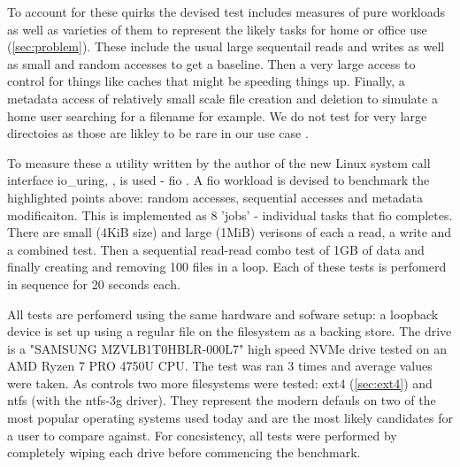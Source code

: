        To account for these quirks the devised test includes measures of pure
        workloads as well as varieties of them to represent the likely tasks
        for home or office use (\autoref{sec:problem}). These include the usual
        large sequentail reads and writes as well as small and random accesses
        to get a baseline. Then a very large access to control for things like
        caches that might be speeding things up. Finally, a metadata access of
        relatively small scale file creation and deletion to simulate a home
        user searching for a filename for example. We do not test for very
        large directoies as those are likley to be rare in our use case
        \cite{contents_study}.


        To measure these a utility written by the author of the new Linux
        system call interface io\_uring, \citeauthor{IO_uring}, is used - fio
        \cite{fio}. A fio workload is devised to benchmark the highlighted
        points above: random accesses, sequential accesses and metadata
        modificaiton. This is implemented as 8 'jobs' - individual tasks that
        fio completes. There are small (4KiB size) and large (1MiB) verisons
        of each a read, a write and a combined test. Then a sequential
        read-read combo test of 1GB of data and finally creating and removing
        100 files in a loop. Each of these tests is perfomerd in sequence for
        20 seconds each.

        All tests are perfomerd using the same hardware and sofware setup: a
        loopback device is set up using a regular file on the filesystem as a
        backing store. The drive is a "SAMSUNG MZVLB1T0HBLR-000L7" high speed
        NVMe drive tested on an AMD Ryzen 7 PRO 4750U CPU. The test was ran 3
        times and average values were taken. As controls two more filesystems
        were tested: ext4 (\autoref{sec:ext4}) and ntfs (with the ntfs-3g driver).
        They represent the modern defauls on two of the most popular operating
        systems used today and are the most likely candidates for a user to
        compare against. For concsistency, all tests were performed by
        completely wiping each drive before commencing the benchmark.


